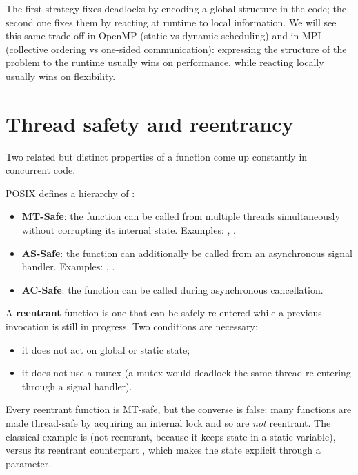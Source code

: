 \begin{observationblock}
The first strategy fixes deadlocks by encoding a global structure in the code; the second one fixes them by reacting at runtime to local information. We will see this same trade-off in OpenMP (static vs dynamic scheduling) and in MPI (collective ordering vs one-sided communication): expressing the structure of the problem to the runtime usually wins on performance, while reacting locally usually wins on flexibility.
\end{observationblock}

\section{Thread safety and reentrancy}

Two related but distinct properties of a function come up constantly in concurrent code.

POSIX defines a hierarchy of :

\begin{itemize}[noitemsep]
    \item \textbf{MT-Safe}: the function can be called from multiple threads simultaneously without corrupting its internal state. Examples: , .
    \item \textbf{AS-Safe}: the function can additionally be called from an asynchronous signal handler. Examples: , .
    \item \textbf{AC-Safe}: the function can be called during asynchronous cancellation.
\end{itemize}

A \textbf{reentrant} function is one that can be safely re-entered while a previous invocation is still in progress. Two conditions are necessary:

\begin{itemize}[noitemsep]
    \item it does not act on global or static state;
    \item it does not use a mutex (a mutex would deadlock the same thread re-entering through a signal handler).
\end{itemize}

Every reentrant function is MT-safe, but the converse is false: many functions are made thread-safe by acquiring an internal lock and so are \emph{not} reentrant. The classical example is  (not reentrant, because it keeps state in a static variable), versus its reentrant counterpart , which makes the state explicit through a parameter.

